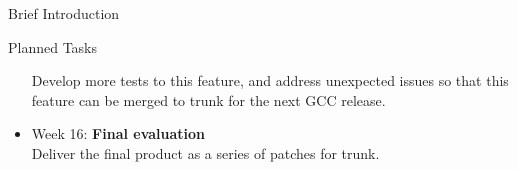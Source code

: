 \documentclass[12pt]{article}
\begin{document}
\begin{section}{Brief Introduction}
\begin{subsection}{Planned Tasks}
\begin{itemize}
  Develop more tests to this feature, and address unexpected issues
  so that this feature can be merged to trunk for the next GCC
  release.

\item{Week 16:} \textbf{Final evaluation}\\
  Deliver the final product as a series of patches for trunk.


\end{itemize}
\end{subsection}

\end{section}
\end{document}
